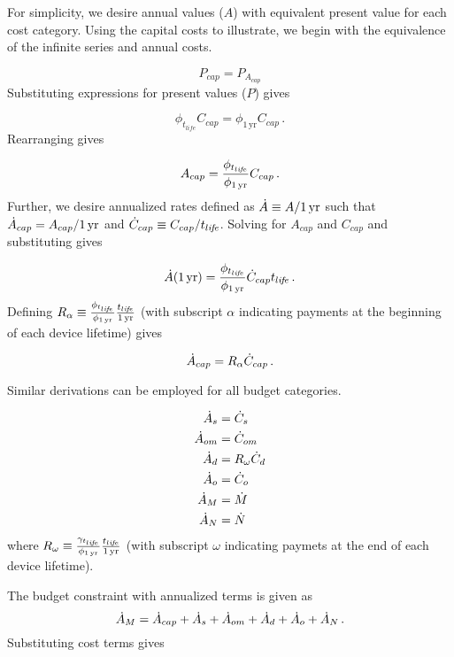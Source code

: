 For simplicity, we desire annual values ($A$)
with equivalent present value for each cost category. 
Using the capital costs to illustrate, 
we begin with the equivalence of the infinite series and 
annual costs.

\begin{equation}
  P_{cap} = P_{A_{cap}}
\end{equation}
%
Substituting expressions for present values ($P$) gives

\begin{equation}
  \phi_{t_{life}} C_{cap} = \phi_{1\,\mathrm{yr}} C_{cap} \, .
\end{equation}
%
Rearranging gives

\begin{equation}
  A_{cap} = \frac{\phi_{t_{li\!f\!e}}}{\phi_{1\,\mathrm{yr}}} C_{cap} \, .
\end{equation}
%
Further, we desire annualized rates defined as
$\dot{A} \equiv A/1\,\mathrm{yr}$ such that
$\dot{A}_{cap} = A_{cap}/1\,\mathrm{yr}$
and 
$\dot{C}_{cap} \equiv C_{cap}/t_{li\!f\!e}$.
Solving for $A_{cap}$ and $C_{cap}$ and substituting gives

\begin{equation}
  \dot{A} (1\,\mathrm{yr}) = \frac{\phi_{t_{li\!f\!e}}}{\phi_{1\,\mathrm{yr}}} \dot{C}_{cap} t_{li\!f\!e} \, .
\end{equation}
%
Defining $R_\alpha \equiv \frac{\phi_{t_{li\!f\!e}}}{\phi_{1\,\mathrm{yr}}} \frac{t_{li\!f\!e}}{1\,\mathrm{yr}}$ 
(with subscript $\alpha$ indicating payments at the beginning of each 
device lifetime) gives

\begin{equation}
  \dot{A}_{cap} = R_\alpha \dot{C}_{cap} \, .
\end{equation}

Similar derivations can be employed for all budget categories.

\begin{align}
  \dot{A}_s &= \dot{C}_s \\
  \dot{A}_{om} &= \dot{C}_{om} \\
  \dot{A}_d &= R_\omega \dot{C}_d \\
  \dot{A}_o &= \dot{C}_o \\
  \dot{A}_M &= \dot{M} \\
  \dot{A}_N &= \dot{N}
\end{align}
%
where $R_\omega \equiv \frac{\gamma_{t_{li\!f\!e}}}{\phi_{1\,\mathrm{yr}}} \frac{t_{li\!f\!e}}{1\,\mathrm{yr}}$
(with subscript $\omega$ indicating paymets at the end of each device lifetime).

The budget constraint with annualized terms is given as
%
\begin{equation}
  \dot{A}_M = \dot{A}_{cap} + 
               \dot{A}_s + 
               \dot{A}_{om} + 
               \dot{A}_d + 
               \dot{A}_o + 
               \dot{A}_N \, .
\end{equation}
%
Substituting cost terms gives

